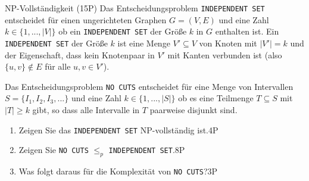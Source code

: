 \documentclass{article}
\begin{document}
\begin{exercise}{NP-Vollständigkeit (15P)}
  Das Entscheidungsproblem \texttt{INDEPENDENT SET} entscheidet für einen ungerichteten Graphen $G = (V,E)$ und eine Zahl $k \in \{1,...,|V|\}$ ob ein \texttt{INDEPENDENT SET} der Größe $k$ in $G$ enthalten ist. Ein \texttt{INDEPENDENT SET} der Größe $k$ ist eine Menge $V' \subseteq V$ von Knoten mit $|V'| = k$ und der Eigenschaft, dass kein Knotenpaar in $V'$ mit Kanten verbunden ist (also $\{u, v\} \not\in E$ für alle $u, v \in V'$).\par
  Das Entscheidungsproblem \texttt{NO CUTS} entscheidet für eine Menge von Intervallen $S = \{I_1,I_2,I_3,...\}$ und eine Zahl $k \in \{1,...,|S|\}$ ob es eine Teilmenge $T \subseteq S$ mit $|T| \geq k$ gibt, so dass alle Intervalle in $T$ paarweise disjunkt sind.
  \begin{enumerate}
    \item Zeigen Sie das \texttt{INDEPENDENT SET} NP-vollständig ist.\hfill 4P
    \item Zeigen Sie \texttt{NO CUTS} $\leq_p$ \texttt{INDEPENDENT SET}.\hfill 8P
    \item Was folgt daraus für die Komplexität von \texttt{NO CUTS}?\hfill 3P
  \end{enumerate}
  \begin{solution}
  \end{solution}
\end{exercise}
\end{document}
